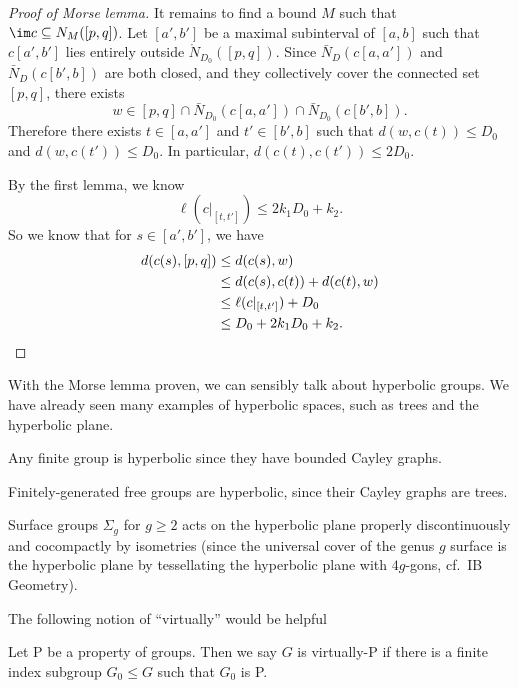 \documentclass[a4paper]{article}
\begin{document}
\begin{proof}[Proof of Morse lemma]
  It remains to find a bound $M$ such that $\im c \subseteq N_M([p, q])$. Let $[a', b']$ be a maximal subinterval of $[a, b]$ such that $c[a', b']$ lies entirely outside $\mathring{N}_{D_0}([p, q])$. Since $\bar{N}_D(c[a, a'])$ and $\bar{N}_D(c[b', b])$ are both closed, and they collectively cover the connected set $[p, q]$, there exists
  \[
    w \in [p, q] \cap \bar{N}_{D_0}(c[a, a']) \cap \bar{N}_{D_0}(c[b', b]).
  \]
  Therefore there exists $t \in [a, a']$ and $t' \in [b', b]$ such that $d(w, c(t)) \leq D_0$ and $d(w, c(t')) \leq D_0$. In particular, $d(c(t), c(t')) \leq 2 D_0$.

  By the first lemma, we know
  \[
    \ell(c|_{[t, t']}) \leq 2k_1 D_0 + k_2.
  \]
  So we know that for $s \in [a', b']$, we have
  \begin{align*}
    d(c(s), [p, q]) &\leq d(c(s), w) \\
    &\leq d(c(s), c(t)) + d(c(t), w) \\
    &\leq \ell(c|_{[t, t']}) + D_0 \\
    &\leq D_0 + 2k_1 D_0 + k_2.\qedhere
  \end{align*}
\end{proof}

With the Morse lemma proven, we can sensibly talk about hyperbolic groups. We have already seen many examples of hyperbolic spaces, such as trees and the hyperbolic plane.

\begin{eg}
  Any finite group is hyperbolic since they have bounded Cayley graphs.
\end{eg}

\begin{eg}
  Finitely-generated free groups are hyperbolic, since their Cayley graphs are trees.
\end{eg}

\begin{eg}
  Surface groups $\Sigma_g$ for $g \geq 2$ acts on the hyperbolic plane properly discontinuously and cocompactly by isometries (since the universal cover of the genus $g$ surface is the hyperbolic plane by tessellating the hyperbolic plane with $4g$-gons, cf.\ IB Geometry).
\end{eg}

The following notion of ``virtually'' would be helpful
\begin{defi}[virtually-P]
  Let P be a property of groups. Then we say $G$ is virtually-P if there is a finite index subgroup $G_0 \leq G$ such that $G_0$ is P.
\end{defi}
\end{document}
